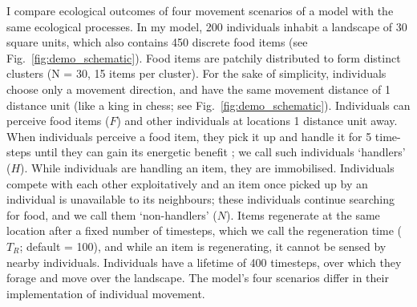 \begin{interludeenv}
I compare ecological outcomes of four movement scenarios of a model with the same ecological processes.
In my model, 200 individuals inhabit a landscape of 30 square units, which also contains 450 discrete food items (see Fig.~\ref{fig:demo_schematic}).
Food items are patchily distributed to form distinct clusters (N = 30, 15 items per cluster).
For the sake of simplicity, individuals choose only a movement direction, and have the same movement distance of 1 distance unit (like a king in chess; see Fig.~\ref{fig:demo_schematic}).
Individuals can perceive food items ($F$) and other individuals at locations 1 distance unit away.
When individuals perceive a food item, they pick it up and handle it for 5 time-steps until they can gain its energetic benefit \citep{ruxton1992,gupte2021a,gupte2022c}; we call such individuals `handlers' ($H$).
While individuals are handling an item, they are immobilised.
Individuals compete with each other exploitatively and an item once picked up by an individual is unavailable to its neighbours; these individuals continue searching for food, and we call them `non-handlers' ($N$).
Items regenerate at the same location after a fixed number of timesteps, which we call the regeneration time ($T_R$; default = 100), and while an item is regenerating, it cannot be sensed by nearby individuals.
Individuals have a lifetime of 400 timesteps, over which they forage and move over the landscape.
The model's four scenarios differ in their implementation of individual movement.


\end{interludeenv}
